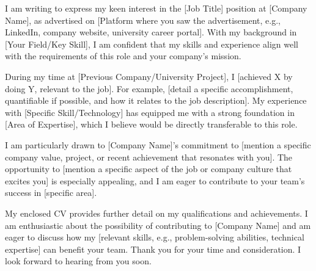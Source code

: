 \documentclass[a4paper,12pt]{article}
\begin{document}
\vspace{15pt} %


I am writing to express my keen interest in the [Job Title] position at [Company Name], as advertised on [Platform where you saw the advertisement, e.g., LinkedIn, company website, university career portal]. With my background in [Your Field/Key Skill], I am confident that my skills and experience align well with the requirements of this role and your company's mission.

\vspace{10pt}

During my time at [Previous Company/University Project], I [achieved X by doing Y, relevant to the job]. For example, [detail a specific accomplishment, quantifiable if possible, and how it relates to the job description]. My experience with [Specific Skill/Technology] has equipped me with a strong foundation in [Area of Expertise], which I believe would be directly transferable to this role.

\vspace{10pt}

I am particularly drawn to [Company Name]'s commitment to [mention a specific company value, project, or recent achievement that resonates with you]. The opportunity to [mention a specific aspect of the job or company culture that excites you] is especially appealing, and I am eager to contribute to your team's success in [specific area].

\vspace{10pt}

My enclosed CV provides further detail on my qualifications and achievements. I am enthusiastic about the possibility of contributing to [Company Name] and am eager to discuss how my [relevant skills, e.g., problem-solving abilities, technical expertise] can benefit your team. Thank you for your time and consideration. I look forward to hearing from you soon.
\end{document}
